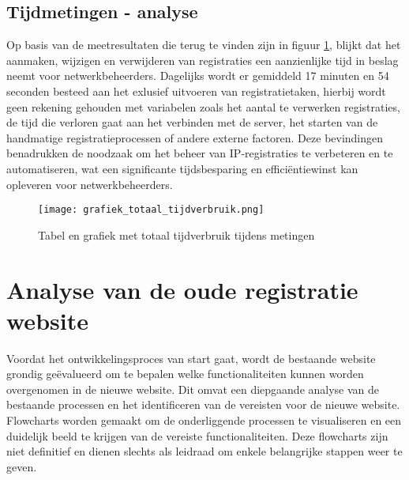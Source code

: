 \subsection{Tijdmetingen - analyse}
Op basis van de meetresultaten die terug te vinden zijn in figuur \ref{fig:tijdverbruik_metingen}, blijkt dat het aanmaken, wijzigen en verwijderen van registraties een aanzienlijke tijd in beslag neemt voor netwerkbeheerders. Dagelijks wordt er gemiddeld 17 minuten en 54 seconden besteed aan het exlusief uitvoeren van registratietaken, hierbij wordt geen rekening gehouden met variabelen zoals het aantal te verwerken registraties, de tijd die verloren gaat aan het verbinden met de server, het starten van de handmatige registratieprocessen of andere externe factoren. Deze bevindingen benadrukken de noodzaak om het beheer van IP-registraties te verbeteren en te automatiseren, wat een significante tijdsbesparing en efficiëntiewinst kan opleveren voor netwerkbeheerders.

\begin{figure}[H]
    \texttt{[image: grafiek\_totaal\_tijdverbruik.png]}
    \caption{Tabel en grafiek met totaal tijdverbruik tijdens metingen}
    \label{fig:tijdverbruik_metingen}
\end{figure}

\section{Analyse van de oude registratie website}
Voordat het ontwikkelingsproces van start gaat, wordt de bestaande website grondig geëvalueerd om te bepalen welke functionaliteiten kunnen worden overgenomen in de nieuwe website. Dit omvat een diepgaande analyse van de bestaande processen en het identificeren van de vereisten voor de nieuwe website. Flowcharts worden gemaakt om de onderliggende processen te visualiseren en een duidelijk beeld te krijgen van de vereiste functionaliteiten. Deze flowcharts zijn niet definitief en dienen slechts als leidraad om enkele belangrijke stappen weer te geven.

